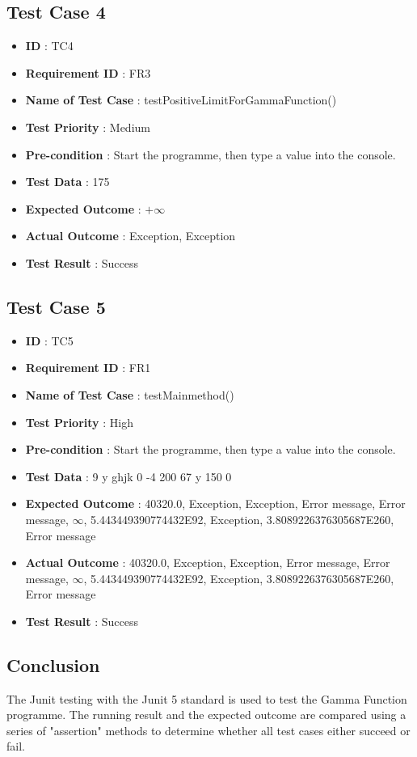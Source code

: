 \documentclass[12pt,a4paper]{report}
\begin{document}
\subsection{Test Case 4}
\begin{itemize}
    \item \textbf{ID} : TC4
    \item \textbf{Requirement ID} : FR3
    \item \textbf{Name of Test Case} : testPositiveLimitForGammaFunction()
    \item \textbf{Test Priority} : Medium
    \item \textbf{Pre-condition} : Start the programme, then type a value into the console.
    \item \textbf{Test Data} : 175
    \item \textbf{Expected Outcome} : $+\infty$
    \item \textbf{Actual Outcome} : Exception, Exception
    \item \textbf{Test Result} : Success
\end{itemize}

\subsection{Test Case 5}
\begin{itemize}
    \item \textbf{ID} : TC5
    \item \textbf{Requirement ID} : FR1
    \item \textbf{Name of Test Case} : testMainmethod()
    \item \textbf{Test Priority} : High
    \item \textbf{Pre-condition} : Start the programme, then type a value into the console.
    \item \textbf{Test Data} : 9 y ghjk 0 -4 200 67 y 150 0
    \item \textbf{Expected Outcome} : 40320.0, Exception, Exception, Error message, Error message, $\infty$, 5.443449390774432E92, Exception, 3.8089226376305687E260, Error message
    \item \textbf{Actual Outcome} : 40320.0, Exception, Exception, Error message, Error message, $\infty$, 5.443449390774432E92, Exception, 3.8089226376305687E260, Error message
    \item \textbf{Test Result} : Success
\end{itemize}


\subsection{Conclusion}
The Junit testing with the Junit 5 standard is used to test the Gamma Function programme. The running result and the expected outcome are compared using a series of "assertion" methods to determine whether all test cases either succeed or fail.
\end{document}

